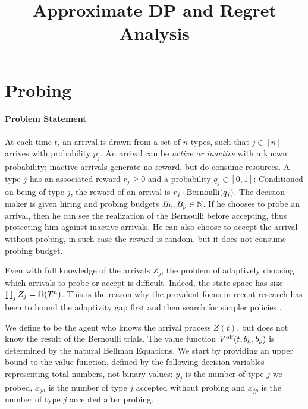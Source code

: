\documentclass[letterpaper,11pt]{article}
\title{\vspace{-1cm} \bf Approximate DP and Regret Analysis   \vspace{-1.3cm}}
\author{}
\begin{document}
\maketitle

\section{Probing}

\paragraph{Problem Statement}
At each time $t$, an arrival is drawn from a set of $n$ types, such that $j\in[n]$ arrives with probability $p_j$.
An arrival can be \emph{active or inactive} with a known probability; inactive arrivals generate no reward, but do consume resources.
A type $j$ has an associated reward $r_j\geq 0$ and a probability $q_j\in [0,1]$: Conditioned on being of type $j$, the reward of an arrival is $r_j\cdot \operatorname{Bernoulli}(q_j)$.
The decision-maker is given hiring and probing budgets $B_h,B_p\in\mathbb{N}$.
If he chooses to probe an arrival, then he can see the realization of the Bernoulli before accepting, thus protecting him against inactive arrivals.
He can also choose to accept the arrival without probing, in such case the reward is random, but it does not consume probing budget.

Even with full knowledge of the arrivals $Z_j$, the problem of adaptively choosing which arrivals to probe or accept is difficult.
Indeed, the state space has size $\prod_jZ_j = \Omega(T^n)$.
This is the reason why the prevalent focus in recent research has been to bound the adaptivity gap first and then search for simpler policies \cite{adaptivity_gaps}.

We define \off to be the agent who knows the arrival process $Z(t)$, but does not know the result of the Bernoulli trials.
The value function $V^{\text{off}}(t,b_h,b_p)$ is determined by the natural Bellman Equations.
We start by providing an upper bound to the value function, defined by the following decision variables representing total numbers, not binary values: $y_j$ is the number of type $j$ we probed, $x_{ja}$ is the number of type $j$ accepted without probing and $x_{jp}$ is the number of type $j$ accepted after probing.
\end{document}
